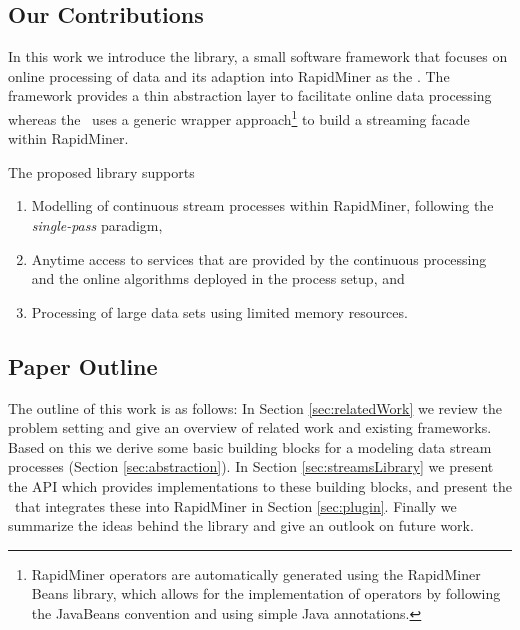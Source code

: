 \subsection{Our Contributions}
In this work we introduce the \streams library, a small software
framework that focuses on online processing of data and its adaption
into RapidMiner as the \plugin. The \streams framework provides a
thin abstraction layer to facilitate online data processing whereas
the \plugin\ uses a generic wrapper approach\footnote{RapidMiner
  operators are automatically generated using the \textsf{RapidMiner
    Beans} library, which allows for the implementation of operators
  by following the JavaBeans convention and using simple Java
  annotations.} to build a streaming facade within RapidMiner.

The proposed library supports
\begin{enumerate}
\item Modelling of continuous stream processes within RapidMiner,
  following the {\em single-pass} paradigm,
\item Anytime access to services that are provided by the continuous
  processing and the online algorithms deployed in the process setup,
  and
\item Processing of large data sets using limited memory resources.
\end{enumerate}

\subsection{Paper Outline}
The outline of this work is as follows: In Section
\ref{sec:relatedWork} we review the problem setting and give an
overview of related work and existing frameworks.
Based on this we derive some basic building blocks for a modeling data
stream processes (Section \ref{sec:abstraction}). In Section
\ref{sec:streamsLibrary} we present the \streams API which provides
implementations to these building blocks, and present the \plugin\
that integrates these into RapidMiner in Section
\ref{sec:plugin}. Finally we summarize the ideas behind the \streams
library and give an outlook on future work.
